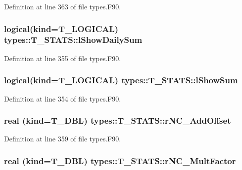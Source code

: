 Definition at line 363 of file types.F90.

\hypertarget{typetypes_1_1_t___s_t_a_t_s_a6e5ccf0b93d97e0fa1c8464f165f02f5}{
\subsubsection[{lShowDailySum}]{\setlength{\rightskip}{0pt plus 5cm}logical(kind={\bf T\_\-LOGICAL}) {\bf types::T\_\-STATS::lShowDailySum}}}
\label{typetypes_1_1_t___s_t_a_t_s_a6e5ccf0b93d97e0fa1c8464f165f02f5}


Definition at line 355 of file types.F90.

\hypertarget{typetypes_1_1_t___s_t_a_t_s_a31ce6e9974f157f2d96c8a260e26dc96}{
\subsubsection[{lShowSum}]{\setlength{\rightskip}{0pt plus 5cm}logical(kind={\bf T\_\-LOGICAL}) {\bf types::T\_\-STATS::lShowSum}}}
\label{typetypes_1_1_t___s_t_a_t_s_a31ce6e9974f157f2d96c8a260e26dc96}


Definition at line 354 of file types.F90.

\hypertarget{typetypes_1_1_t___s_t_a_t_s_a4f9c70ef6766721c1a39b7788e0fb863}{
\subsubsection[{rNC\_\-AddOffset}]{\setlength{\rightskip}{0pt plus 5cm}real (kind={\bf T\_\-DBL}) {\bf types::T\_\-STATS::rNC\_\-AddOffset}}}
\label{typetypes_1_1_t___s_t_a_t_s_a4f9c70ef6766721c1a39b7788e0fb863}


Definition at line 359 of file types.F90.

\hypertarget{typetypes_1_1_t___s_t_a_t_s_a59f5b3b351197c23b589b94847bad0f4}{
\subsubsection[{rNC\_\-MultFactor}]{\setlength{\rightskip}{0pt plus 5cm}real (kind={\bf T\_\-DBL}) {\bf types::T\_\-STATS::rNC\_\-MultFactor}}}
\label{typetypes_1_1_t___s_t_a_t_s_a59f5b3b351197c23b589b94847bad0f4}



